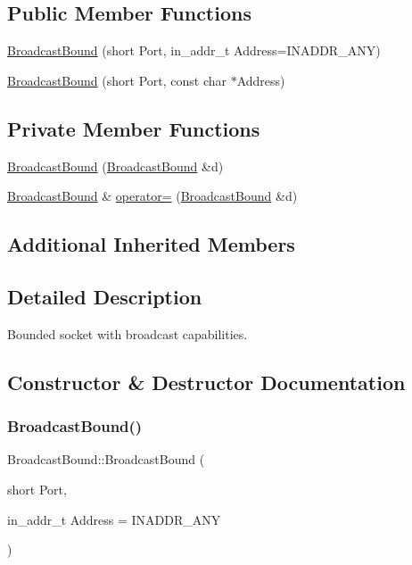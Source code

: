 \subsection*{Public Member Functions}
\begin{DoxyCompactItemize}
\item 
\hyperlink{classBroadcastBound_a22bb046de1f37baeb7c912c6383365f1}{Broadcast\+Bound} (short Port, in\+\_\+addr\+\_\+t Address=I\+N\+A\+D\+D\+R\+\_\+\+A\+NY)
\item 
\hyperlink{classBroadcastBound_a77bafc8d719b40f9e8de10ca8f9969c1}{Broadcast\+Bound} (short Port, const char $\ast$Address)
\end{DoxyCompactItemize}
\subsection*{Private Member Functions}
\begin{DoxyCompactItemize}
\item 
\hyperlink{classBroadcastBound_a154c02a5f59ba620ac0b09431a1fae07}{Broadcast\+Bound} (\hyperlink{classBroadcastBound}{Broadcast\+Bound} \&d)
\item 
\hyperlink{classBroadcastBound}{Broadcast\+Bound} \& \hyperlink{classBroadcastBound_ad87e73f7cba821eea8f111c64868356b}{operator=} (\hyperlink{classBroadcastBound}{Broadcast\+Bound} \&d)
\end{DoxyCompactItemize}
\subsection*{Additional Inherited Members}


\subsection{Detailed Description}
Bounded socket with broadcast capabilities. 

\subsection{Constructor \& Destructor Documentation}
\mbox{\label{classBroadcastBound_a22bb046de1f37baeb7c912c6383365f1}} 
\subsubsection{\texorpdfstring{Broadcast\+Bound()}{BroadcastBound()}\hspace{0.1cm}{\footnotesize\ttfamily [1/3]}}
{\footnotesize\ttfamily Broadcast\+Bound\+::\+Broadcast\+Bound (\begin{DoxyParamCaption}\item[{short}]{Port,  }\item[{in\+\_\+addr\+\_\+t}]{Address = {\ttfamily INADDR\+\_\+ANY} }\end{DoxyParamCaption})}

